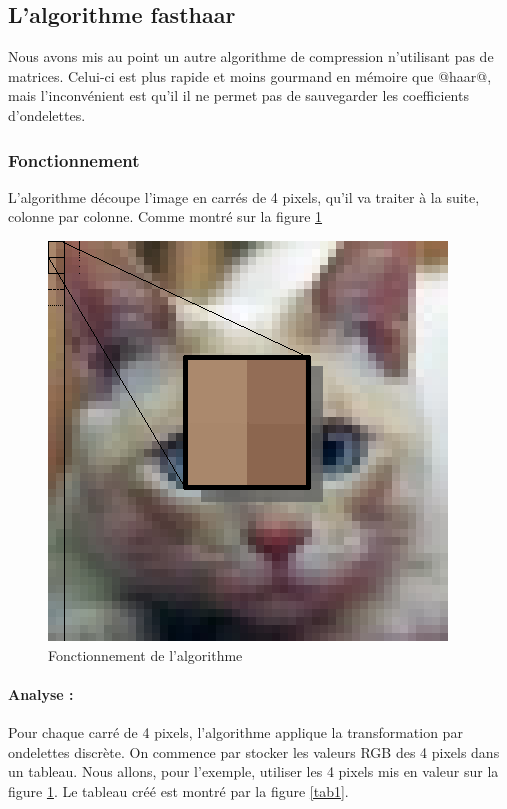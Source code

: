 \documentclass{article}
\begin{document}
\cleardoublepage


\subsection{L'algorithme fasthaar}

Nous avons mis au point un autre algorithme de compression n'utilisant pas de matrices. Celui-ci est plus rapide et moins gourmand en mémoire que @haar@, mais l'inconvénient est qu'il il ne permet pas de sauvegarder les coefficients d'ondelettes.

\subsubsection{Fonctionnement}

L'algorithme découpe l'image en carrés de 4 pixels, qu'il va traiter à la suite, colonne par colonne. Comme montré sur la figure \ref{algo}

\begin{figure}[!h]
\centering
\includegraphics[scale=0.8]{minichat.jpg}
\caption{Fonctionnement de l'algorithme}
\label{algo}
\end{figure}

\paragraph{Analyse :}

Pour chaque carré de 4 pixels, l'algorithme applique la transformation par ondelettes discrète. On commence par stocker les valeurs RGB des 4 pixels dans un tableau. Nous allons, pour l'exemple, utiliser les 4 pixels mis en valeur sur la figure \ref{algo}. Le tableau créé est montré par la figure \ref{tab1}.
\end{document}
